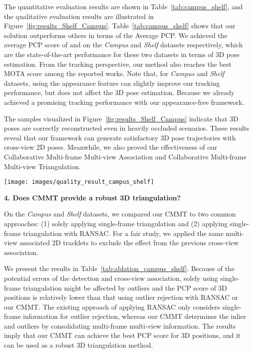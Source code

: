 \documentclass{CVM}
\begin{document}
The quantitative evaluation results are shown in Table~\ref{tab:campus_shelf}, and the qualitative evaluation results are illustrated in Figure~\ref{fig:results_Shelf_Campus}. Table~\ref{tab:campus_shelf} shows that our solution outperforms others in terms of the Average PCP. We achieved the average PCP score of  and  on the \textit{Campus} and \textit{Shelf} datasets respectively, which are the state-of-the-art performance for these two datasets in terms of 3D pose estimation. From the tracking perspective, our method also reaches the best MOTA score among the reported works. Note that, for \textit{Campus} and \textit{Shelf} datasets, using the appearance feature can slightly improve our tracking performance, but does not affect the 3D pose estimation. Because we already achieved a promising tracking performance with our appearance-free framework.


The samples visualized in Figure~\ref{fig:results_Shelf_Campus} indicate that 3D poses are correctly reconstructed even in heavily occluded scenarios. These results reveal that our framework can generate satisfactory 3D pose trajectories with cross-view 2D poses. Meanwhile, we also proved the effectiveness of our Collaborative Multi-frame Multi-view Association and Collaborative Multi-frame Multi-view Triangulation.


\begin{figure*}[!h]
  \centering
  \texttt{[image: images/quality\_result\_campus\_shelf]}
  \caption{\textbf{Qualitative results on the test set of \textit{Shelf} and \textit{Campus} datasets}~\cite{fleuret2007multicamera,BelagiannisAASN16}. Each person is represented with unique color based on the tracking results.}\label{fig:results_Shelf_Campus}
\end{figure*}





\textbf{4. Does CMMT provide a robust 3D triangulation?} 

On the \textit{Campus} and \textit{Shelf} datasets, we compared our CMMT to two common approaches: (1) solely applying single-frame triangulation and (2) applying single-frame triangulation with RANSAC. For a fair study, we applied the same multi-view associated 2D tracklets to exclude the effect from the previous cross-view association.

We present the results in Table~\ref{tab:ablation_campus_shelf}. Because of the potential errors of the detection and cross-view association, solely using single-frame triangulation might be affected by outliers and the PCP score of 3D positions is relatively lower than that using outlier rejection with RANSAC or our CMMT. The existing approach of applying RANSAC only considers single-frame information for outlier rejection, whereas our CMMT determines the inlier and outliers by consolidating multi-frame multi-view information. The results imply that our CMMT can achieve the best PCP score for 3D positions, and it can be used as a robust 3D triangulation method.
\end{document}
